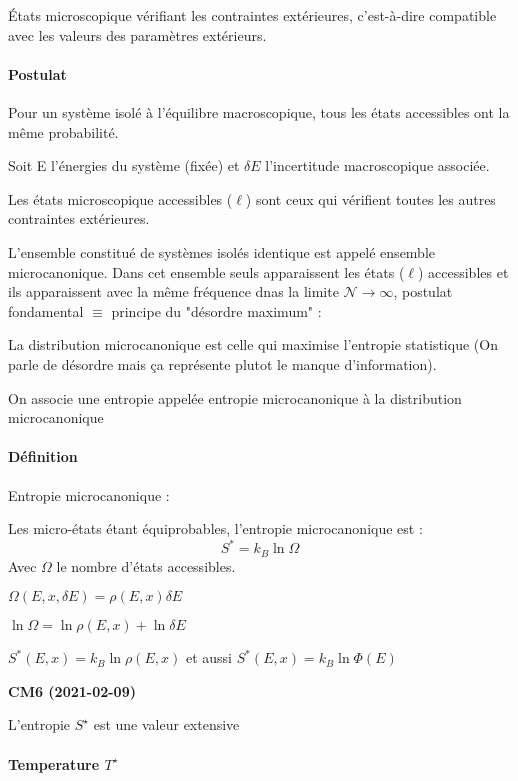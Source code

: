 \documentclass[12pt,a4paper]{report}
\begin{document}
États microscopique vérifiant les contraintes extérieures, c'est-à-dire compatible avec les valeurs des paramètres extérieurs.

\paragraph{Postulat}

Pour un système isolé à l'équilibre macroscopique, tous les états accessibles ont la même probabilité.

Soit E l'énergies du système (fixée) et \(\delta E\) l'incertitude macroscopique associée.

Les états microscopique accessibles (\(\ell\)) sont ceux qui vérifient toutes les autres contraintes extérieures.

L'ensemble constitué de systèmes isolés identique est appelé ensemble microcanonique. Dans cet ensemble seuls apparaissent les états (\(\ell\)) accessibles et ils apparaissent avec la même fréquence dnas la limite \(\mathcal{N} \rightarrow \infty\), postulat fondamental \(\equiv\) principe du "désordre maximum" :

La distribution microcanonique est celle qui maximise l'entropie statistique (On parle de désordre mais ça représente plutot le manque d'information).

On associe une entropie appelée entropie microcanonique à la distribution microcanonique

\paragraph{Définition} Entropie microcanonique :

Les micro-états étant équiprobables, l'entropie microcanonique est :
\[
	S^* = k_B \ln \Omega
\]
Avec \(\Omega\) le nombre d'états accessibles.

\(\Omega(E,x, \delta	E )= \rho(E, x)\delta E \)

\(\ln \Omega = \ln \rho(E,x) + \ln \delta E\)

\(S^* (E,x) = k_B \ln \rho(E,x)\) et aussi \(S^* (E,x) = k_B \ln \Phi(E)\)

\begin{center}
\textbf{CM6 (2021-02-09)}
\end{center}

L'entropie \(S^\star\) est une valeur extensive

\paragraph{Temperature \(T^\star\)}
\end{document}
